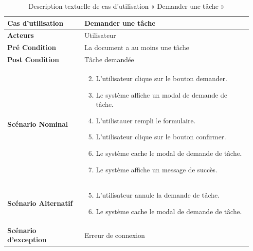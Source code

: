 \begin{longtable}{|p{5cm}|p{10cm}|}
  \caption{Description textuelle de cas d'utilisation « Demander une tâche »} \label{tab:DescriptionTextuelleDeCasDUtilisationDemanderUneTache} \\


\hline
\textbf{Cas d'utilisation}&Demander une tâche\\
\hline
\textbf{Acteurs}&Utilisateur\\
\hline
\textbf{Pré Condition}&La document a au moins une tâche\\
\hline
\textbf{Post Condition}&Tâche demandée\\
\hline
\textbf{Scénario Nominal}&
\vspace{-\baselineskip}
\begin{enumerate}
    \setcounter{enumi}{1}
    \item L'utilisateur clique sur le bouton demander.
    \item Le système affiche un modal de demande de tâche.
    \item L'utilistauer rempli le formulaire.
    \item L'utilisateur clique sur le bouton confirmer.
    \item Le système cache le modal de demande de tâche.
    \item Le système affiche un message de succès.
\end{enumerate}\\
\hline
\textbf{Scénario Alternatif}&
\vspace{-\baselineskip}
\begin{enumerate}
    \setcounter{enumi}{4}
    \item L'utilisateur annule la demande de tâche.
    \item Le système cache le modal de demande de tâche.
\end{enumerate}\\
\hline
\textbf{Scénario d'exception}&Erreur de connexion\\
\hline
\end{longtable}


